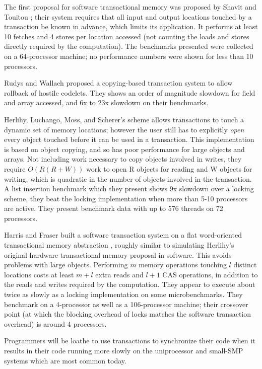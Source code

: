 \documentclass[preprint]{rdbacmconf}
\begin{document}
The first proposal for software transactional memory was proposed by
Shavit and Touitou \cite{ShavitTo95}; their system requires that all
input and output locations touched by a transaction be known in
advance, which limits its application.  It performs at least 10
fetches and 4 stores per location accessed (not counting the loads and
stores directly required by the computation).  The benchmarks
presented were collected on a 64-processor machine; no performance
numbers were shown for less than 10 processors.

Rudys and Wallach \cite{RudysWa02} proposed a copying-based
transaction system to allow rollback of hostile codelets.
They shows an order of magnitude slowdown for field and array
accessed, and 6x to 23x slowdown on their benchmarks.

Herlihy, Luchango, Moss, and Scherer's scheme \cite{HerlihyLuMoSc03}
allows transactions to touch a dynamic set of memory locations;
however the user still has to explicitly \emph{open} every object touched
before it can be used in a transaction.  This implementation is based
on object copying, and so has poor performance for large objects and
arrays.  Not including work necessary to copy objects involved in
writes, they require $O(R(R+W))$ work to open R objects for reading
and W objects for writing, which is quadratic in the number of objects
involved in the transaction.   A list insertion benchmark which they
present shows 9x slowdown over a locking scheme, they beat the locking
implementation when more than 5-10 processors are active.  They
present benchmark data with up to 576 threads on 72 processors.

Harris and Fraser built a software transaction system on a flat
word-oriented transactional memory abstraction \cite{HarrisFr03},
roughly similar to simulating Herlihy's original hardware
transactional memory proposal in software.  This avoids problems with
large objects.  Performing $m$ memory operations touching $l$ distinct
locations costs at least $m+l$ extra reads and $l+1$ CAS operations, in
addition to the reads and writes required by the computation.
They appear to execute about twice as slowly as a locking
implementation on some microbenchmarks.  They benchmark on a
4-processor as well as a 106-processor machine; their crossover point
(at which the blocking overhead of locks matches the software
transaction overhead) is around 4 processors.

Programmers will be loathe to use transactions to synchronize their
code when it results in their code running more slowly on the uniprocessor
and small-SMP systems which are most common today.
\end{document}

